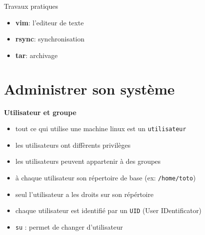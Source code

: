 \documentclass[french]{beamer}
\begin{document}


\begin{frame}
\begin{center}
Travaux pratiques
\begin{itemize}
\item \textbf{vim}: l'editeur de texte
\item \textbf{rsync}: synchronisation
\item \textbf{tar}: archivage
\end{itemize}
\end{center}
\end{frame}

\section{Administrer son système}
\frame{\tableofcontents[current]}


\begin{frame}
\textbf{Utilisateur et groupe}
    \begin{itemize}
    \item tout ce qui utilise une machine linux est un \texttt{utilisateur}
    \item les utilisateurs ont diffèrents privilèges
    \item les utilisateurs peuvent appartenir à des groupes
    \item à chaque utilisateur son répertoire de base (ex: \texttt{/home/toto})
    \item seul l'utilisateur a les droits sur son répértoire
    \item chaque utilisateur est identifié par un \texttt{UID} (User IDentificator)
    \item \texttt{su} : permet de changer d'utilisateur
    \end{itemize}
\end{frame}
\end{document}
